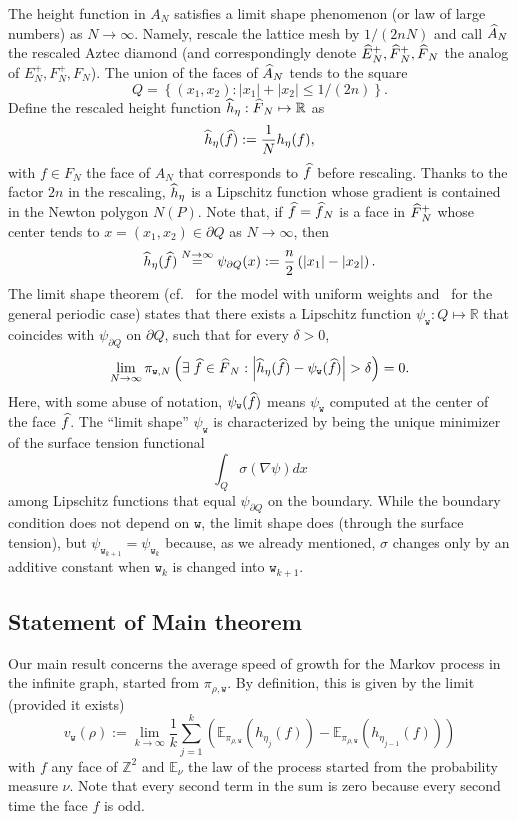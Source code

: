 \documentclass[AHL,Unicode,longabstracts,published]{cedram}
\newcommand{\ttw}{\mathtt{w}}
\newcommand{\bbE}{\mathbb{E}}
\newcommand{\bbZ}{\mathbb{Z}}
\newcommand{\bbR}{\mathbb{R}}
\let\oldhat\hat
\renewcommand*{\hat}[1]{\mathchoice{\widehat{#1}}{\widehat{#1}}{\oldhat{#1}}{\oldhat{#1}}}
\let\oldexists\exists
\renewcommand*{\exists}{\mathrel{\oldexists}}
\newcommand{\ttw}{\mathtt{w}}
\begin{document}
The height function in $A_N$ satisfies a limit shape phenomenon (or law of large numbers) as $N\to\infty$. Namely, rescale the lattice mesh by $1/(2nN)$ and call $\hat A_N$ the rescaled Aztec diamond (and correspondingly denote $\hat E_N^+,\hat F_N^+,\hat F_N$ the analog of $E_N^+,F_N^+,F_N$). The union of the faces of $\hat A_N$ tends to the square
\begin{equation}\label{eq:Q}
Q=\left\{(x_1,x_2):|x_1|+|x_2|\le 1/(2n)\right\}.
\end{equation}
Define the rescaled height function $\hat h_\eta:\hat F_N\mapsto \bbR$ as
\[
\hat h_\eta(\hat f):=\frac1N h_\eta(f),
\]
with $f\in F_N$ the face of $A_N$ that corresponds to $\hat f$ before rescaling. Thanks to the factor $2n$ in the rescaling, $\hat h_\eta$ is a Lipschitz function whose gradient is contained in the Newton polygon $N(P)$. Note that, if $\hat f=\hat f_N$ is a face in $\hat F^+_N$ whose center tends to $x=(x_1,x_2)\in \partial Q$ as $N\to\infty$, then
\begin{equation}\label{eq:partialQ}
\hat h_\eta(\hat f)\stackrel{N\to\infty}= \psi_{\partial Q}(x):=\frac n2\left({|x_1|-|x_2|}\right).
\end{equation}
The limit shape theorem (cf.~\cite{CKP01} for the model with uniform weights and~\cite{kuchumov2017limit} for the general periodic case) states that there exists a Lipschitz function $\psi_{\ttw}:Q\mapsto \bbR$ that coincides with $\psi_{\partial Q}$ on $\partial Q$, such that for every $\delta>0$,
\begin{equation}\label{eq:lln}
\lim_{N\to\infty} \pi_{\ttw,N}\left(\exists \hat f\in \hat F_N:\left| \hat h_\eta(\hat f)-\psi_{\ttw}(\hat f)\right|>\delta\right)=0.
\end{equation}
Here, with some abuse of notation, $\psi_{\ttw}(\hat f)$ means $\psi_{\ttw}$ computed at the center of the face $\hat f$. The ``limit shape'' $\psi_{\ttw}$ is characterized by being the unique minimizer of the surface tension functional
\[
\int_Q \sigma(\nabla \psi) dx
\]
among Lipschitz functions that equal $\psi_{\partial Q}$ on the boundary. While the boundary condition does not depend on $\ttw$, the limit shape does (through the surface tension), but $\psi_{\ttw_{k+1}}=\psi_{\ttw_{k}}$ because, as we already mentioned, $\sigma$ changes only by an additive constant when $\ttw_k$ is changed into $\ttw_{k+1}$.


\subsection{Statement of Main theorem}
Our main result concerns the average speed of growth for the Markov process in the infinite graph, started from $\pi_{\rho,\ttw}$. By definition, this is given by the limit (provided it exists)
\begin{equation}\label{eq:prov}
v_{\ttw}(\rho):= \lim_{k\to\infty}\frac1k \sum_{j=1}^k\left(\bbE_{\pi_{\rho,\ttw}}\left(h_{\eta_j}(f)\right)-\bbE_{\pi_{\rho,\ttw}}\left(h_{\eta_{j-1}}(f)\right)\right)
\end{equation}
with $f$ any face of $\bbZ^2$ and $\bbE_\nu$ the law of the process started from the probability measure $\nu$. Note that every second term in the sum is zero because every second time the face $f$ is odd.
\end{document}
